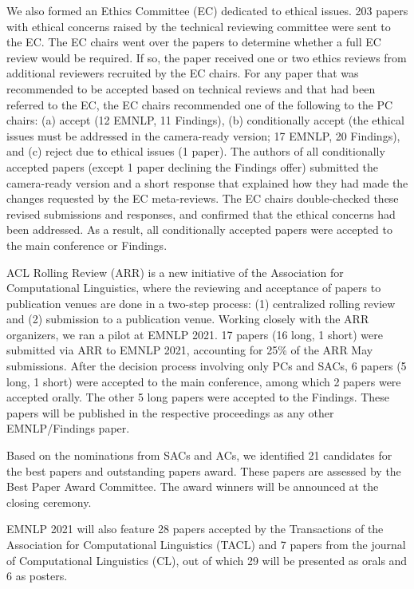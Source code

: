 We also formed an Ethics Committee (EC) dedicated to ethical issues. 203 papers with ethical concerns raised by the technical reviewing committee were sent to the EC. The EC chairs went over the papers to determine whether a full EC review would be required. If so, the paper received one or two ethics reviews from additional reviewers recruited by the EC chairs. For any paper that was recommended to be accepted based on technical reviews and that had been referred to the EC, the EC chairs recommended one of the following to the PC chairs: (a) accept (12 EMNLP, 11 Findings), (b) conditionally accept (the ethical issues must be addressed in the camera-ready version; 17 EMNLP, 20 Findings), and (c) reject due to ethical issues (1 paper). The authors of all conditionally accepted papers (except 1 paper declining the Findings offer) submitted the camera-ready version and a short response that explained how they had made the changes requested by the EC meta-reviews. The EC chairs double-checked these revised submissions and responses, and confirmed that the ethical concerns had been addressed. As a result, all conditionally accepted papers were accepted to the main conference or Findings.

ACL Rolling Review (ARR) is a new initiative of the Association for Computational Linguistics, where the reviewing and acceptance of papers to publication venues are done in a two-step process: (1) centralized rolling review and (2) submission to a publication venue. Working closely with the ARR organizers, we ran a pilot at EMNLP 2021. 17 papers (16 long, 1 short) were submitted via ARR to EMNLP 2021, accounting for 25\% of the ARR May submissions. After the decision process involving only PCs and SACs, 6 papers (5 long, 1 short) were accepted to the main conference, among which 2 papers were accepted orally. The other 5 long papers were accepted to the Findings. These papers will be published in the respective proceedings as any other EMNLP/Findings paper.

Based on the nominations from SACs and ACs, we identified 21 candidates for the best papers and outstanding papers award. These papers are assessed by the Best Paper Award Committee. The award winners will be announced at the closing ceremony.

EMNLP 2021 will also feature 28 papers accepted by the Transactions of the Association for Computational Linguistics (TACL) and 7 papers from the journal of Computational Linguistics (CL), out of which 29 will be presented as orals and 6 as posters.


